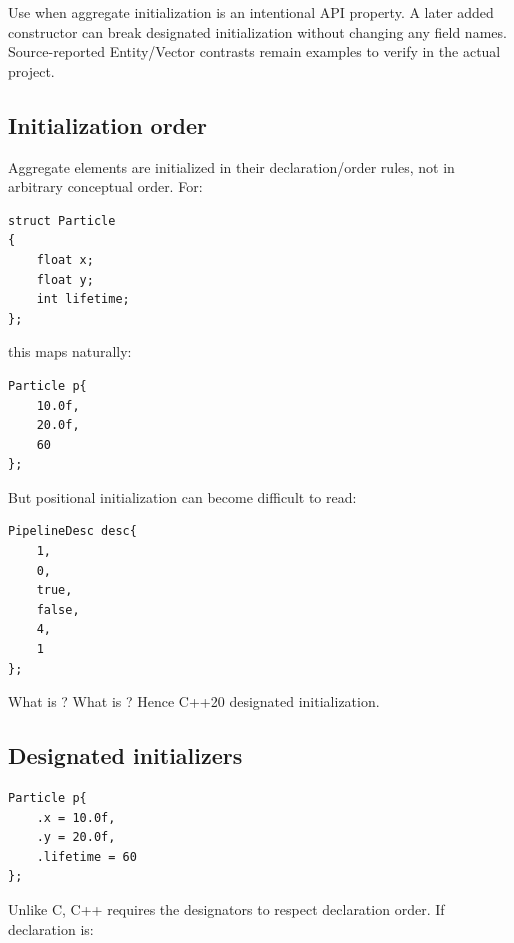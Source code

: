 Use  when aggregate initialization is an intentional API property. A later added constructor can break designated initialization without changing any field names. Source-reported Entity/Vector contrasts remain examples to verify in the actual project.

\subsection{Initialization order}\label{01-foundations-i-ch003-initialization-order}

\hypertarget{01-foundations-i-ch003-initialization-order}{}

Aggregate elements are initialized in their declaration/order rules, not in arbitrary conceptual order. For:

\begin{verbatim}
struct Particle
{
    float x;
    float y;
    int lifetime;
};
\end{verbatim}

this maps naturally:

\begin{verbatim}
Particle p{
    10.0f,
    20.0f,
    60
};
\end{verbatim}

But positional initialization can become difficult to read:

\begin{verbatim}
PipelineDesc desc{
    1,
    0,
    true,
    false,
    4,
    1
};
\end{verbatim}

What is ? What is ? Hence C++20 designated initialization.

\subsection{Designated initializers}\label{01-foundations-i-ch003-designated-initializers}

\hypertarget{01-foundations-i-ch003-designated-initializers}{}

\begin{verbatim}
Particle p{
    .x = 10.0f,
    .y = 20.0f,
    .lifetime = 60
};
\end{verbatim}

Unlike C, C++ requires the designators to respect declaration order. If declaration is:

